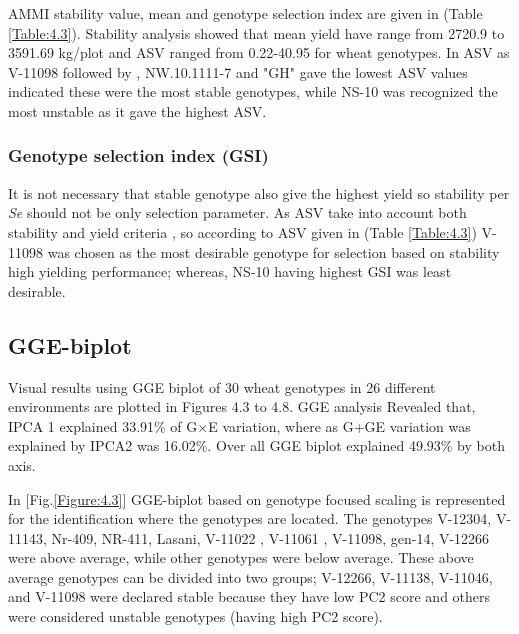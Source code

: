 AMMI stability value, mean and genotype selection index are given in (Table \ref{Table:4.3}). Stability analysis showed that mean yield  have range from 2720.9 to 3591.69 kg/plot and ASV ranged from 0.22-40.95 for wheat genotypes. In ASV as V-11098  followed by , NW.10.1111-7 and "GH" gave the lowest ASV values indicated these were the most stable genotypes, while NS-10 was recognized the most unstable as it gave the highest ASV.
\subsubsection{Genotype selection index (GSI)}
It is not necessary that stable genotype also give the highest yield  so stability per \textit{Se} should not be only selection parameter. As ASV take into account both stability and yield criteria , so according to ASV given in (Table \ref{Table:4.3}) V-11098  was chosen as the most desirable genotype for selection based on  stability high yielding performance; whereas, NS-10 having highest GSI was least desirable. 

\subsection{GGE-biplot}
Visual results using GGE biplot  of 30 wheat genotypes in 26 different environments are plotted in Figures 4.3 to 4.8. GGE analysis Revealed that, IPCA 1 explained 33.91\% of G$\times$E variation, where as G+GE variation was explained by IPCA2 was 16.02\%. Over all GGE biplot explained 49.93\% by both axis.

In [Fig.\ref{Figure:4.3}] GGE-biplot based on genotype focused scaling is represented for the identification where the genotypes are located. The genotypes V-12304, V-11143, Nr-409, NR-411,  Lasani, V-11022 , V-11061 , V-11098, gen-14, V-12266  were above average, while  other genotypes were below average. These above average genotypes can be divided into two groups;  V-12266, V-11138,  V-11046, and V-11098 were declared stable because they have low PC2 score and others were considered unstable genotypes (having high PC2 score).


